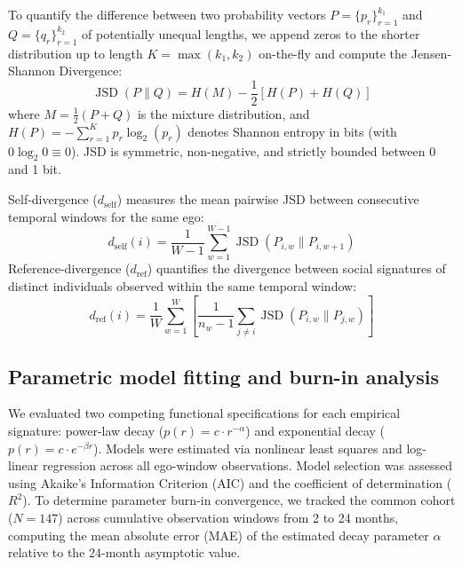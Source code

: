 \documentclass[11pt,letterpaper]{article}
\newcommand{\JSD}{\operatorname{JSD}}
\newcommand{\dself}{d_{\mathrm{self}}}
\newcommand{\dref}{d_{\mathrm{ref}}}
\begin{document}
To quantify the difference between two probability vectors $P = \{p_r\}_{r=1}^{k_1}$ and $Q = \{q_r\}_{r=1}^{k_2}$ of potentially unequal lengths, we append zeros to the shorter distribution up to length $K = \max(k_1, k_2)$ on-the-fly and compute the Jensen-Shannon Divergence:\cite{lin1991divergence}
\begin{equation}
\JSD(P \parallel Q) = H(M) - \frac{1}{2}\left[H(P) + H(Q)\right]
\end{equation}
where $M = \frac{1}{2}(P + Q)$ is the mixture distribution, and $H(P) = -\sum_{r=1}^{K} p_r \log_2(p_r)$ denotes Shannon entropy in bits (with $0 \log_2 0 \equiv 0$). JSD is symmetric, non-negative, and strictly bounded between 0 and 1 bit.

Self-divergence ($\dself$) measures the mean pairwise JSD between consecutive temporal windows for the same ego:
\begin{equation}
\dself(i) = \frac{1}{W-1} \sum_{w=1}^{W-1} \JSD(P_{i,w} \parallel P_{i,w+1})
\end{equation}
Reference-divergence ($\dref$) quantifies the divergence between social signatures of distinct individuals observed within the same temporal window:
\begin{equation}
\dref(i) = \frac{1}{W} \sum_{w=1}^W \left[ \frac{1}{n_w - 1} \sum_{j \neq i} \JSD(P_{i,w} \parallel P_{j,w}) \right]
\end{equation}

\subsection*{Parametric model fitting and burn-in analysis}
We evaluated two competing functional specifications for each empirical signature: power-law decay ($p(r) = c \cdot r^{-\alpha}$) and exponential decay ($p(r) = c \cdot e^{-\beta r}$). Models were estimated via nonlinear least squares and log-linear regression across all ego-window observations. Model selection was assessed using Akaike's Information Criterion (AIC) and the coefficient of determination ($R^2$). To determine parameter burn-in convergence, we tracked the common cohort ($N = 147$) across cumulative observation windows from 2 to 24 months, computing the mean absolute error (MAE) of the estimated decay parameter $\alpha$ relative to the 24-month asymptotic value.
\end{document}
